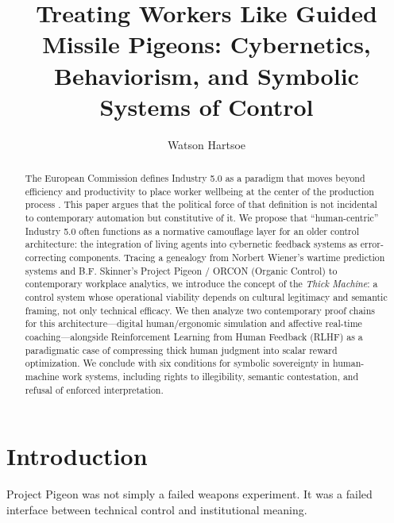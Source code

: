 \documentclass[runningheads]{llncs}
\begin{document}
\title{Treating Workers Like Guided Missile Pigeons: Cybernetics, Behaviorism, and Symbolic Systems of Control}

\author{Watson Hartsoe}

\maketitle

\begin{abstract}
The European Commission defines Industry 5.0 as a paradigm that moves beyond efficiency and productivity to place worker wellbeing at the center of the production process \cite{breque2021industry}. This paper argues that the political force of that definition is not incidental to contemporary automation but constitutive of it. We propose that ``human-centric'' Industry 5.0 often functions as a normative camouflage layer for an older control architecture: the integration of living agents into cybernetic feedback systems as error-correcting components. Tracing a genealogy from Norbert Wiener's wartime prediction systems and B.F. Skinner's Project Pigeon / ORCON (Organic Control) to contemporary workplace analytics, we introduce the concept of the \emph{Thick Machine}: a control system whose operational viability depends on cultural legitimacy and semantic framing, not only technical efficacy. We then analyze two contemporary proof chains for this architecture---digital human/ergonomic simulation and affective real-time coaching---alongside Reinforcement Learning from Human Feedback (RLHF) as a paradigmatic case of compressing thick human judgment into scalar reward optimization. We conclude with six conditions for symbolic sovereignty in human-machine work systems, including rights to illegibility, semantic contestation, and refusal of enforced interpretation.

\end{abstract}

\section{Introduction}

Project Pigeon was not simply a failed weapons experiment. It was a failed interface between technical control and institutional meaning.
\end{document}
